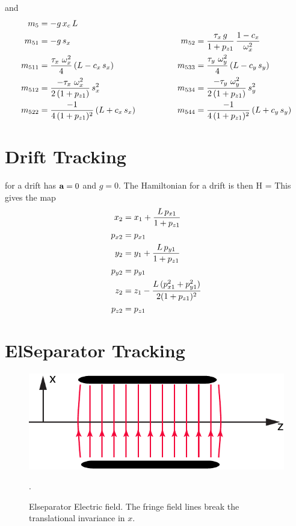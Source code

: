 and
\begin{alignat}{2}
  m_5     &= -g \, x_c \, L & \qquad \qquad & \nonumber \\
  m_{51}  &= -g \, s_x & \qquad \qquad
  m_{52}  &= \frac{\tau_x \, g}{1 + p_{z1}} \, \frac{1 - c_x}{\omega_x^2} \nonumber \\
  m_{511} &= \frac{\tau_x \,\, \omega_x^2}{4} \, (L - c_x \, s_x) & \qquad \qquad
  m_{533} &= \frac{\tau_y \,\, \omega_y^2}{4} \, (L - c_y \, s_y) \nonumber \\
  m_{512} &= \frac{-\tau_x \,\, \omega_x^2}{2 \, (1 + p_{z1})} \, s_x^2 & \qquad \qquad
  m_{534} &= \frac{-\tau_y \,\, \omega_y^2}{2 \, (1 + p_{z1})} \, s_y^2 \nonumber \\
  m_{522} &= \frac{-1}{4 \, (1 + p_{z1})^2} \, (L + c_x \, s_x) & \qquad \qquad
  m_{544} &= \frac{-1}{4 \, (1 + p_{z1})^2} \, (L + c_y \, s_y) \nonumber
\end{alignat}

\section{Drift Tracking}
\label{s:drift.std}

 for a drift has ${\bf a} = 0$ and $g = 0$. The Hamiltonian for a
drift is then
\Begineq
  H =  
\Endeq
This gives the map
\begin{align}
  x_2    &= x_1 + \frac{L \, p_{x1}}{1 + p_{z1}} \nonumber \\
  p_{x2} &= p_{x1}  \nonumber \\
  y_2    &= y_1 + \frac{L \, p_{y1}}{1 + p_{z1}} \nonumber \\
  p_{y2} &= p_{y1}  \\
  z_2    &= z_1 - \frac{L \, (p_{x1}^2 + p_{y1}^2)}{2 (1 + p_{z1})^2} \nonumber \\
  p_{z2} &= p_{z1} \nonumber
\end{align}

\section{ElSeparator Tracking}
\label{s:elsep.std}

\begin{figure}[tb]
  \centering
  \includegraphics[width=5in]{elseparator.pdf}
  \caption[ElSeparator electric field.]
  {
Elseparator Electric field. The fringe field lines break the
translational invariance in $x$.
  }
  \label{f:elsep}.
\end{figure}

